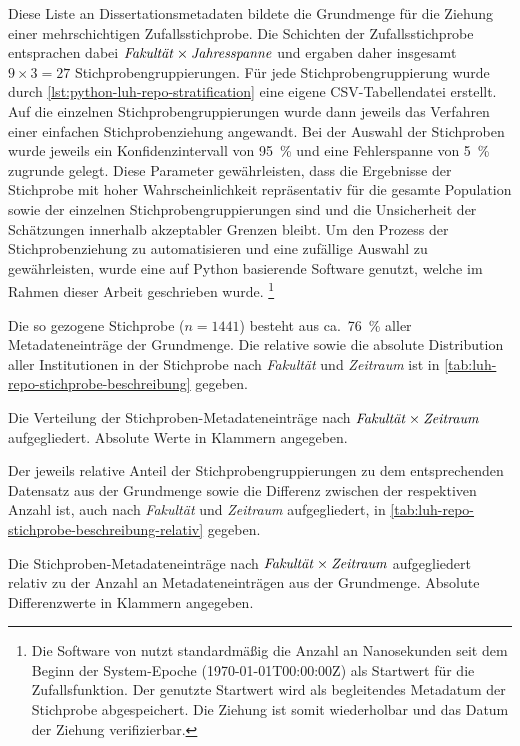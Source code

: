 Diese Liste an Dissertationsmetadaten bildete die Grundmenge für die Ziehung einer mehrschichtigen Zufallsstichprobe.
Die Schichten der Zufallsstichprobe entsprachen dabei $\text{\textit{Fakultät}}\times\text{\textit{Jahresspanne}}$ und ergaben daher insgesamt $\num{9}\times\num{3}=\num{27}$ Stichprobengruppierungen.
Für jede Stichprobengruppierung wurde durch \cref{lst:python-luh-repo-stratification} eine eigene CSV-Tabellendatei erstellt.
Auf die einzelnen Stichprobengruppierungen wurde dann jeweils das Verfahren einer einfachen Stichprobenziehung angewandt.
Bei der Auswahl der Stichproben wurde jeweils ein Konfidenzintervall von \SI[round-mode=places,round-precision=2]{95}{\percent} und eine Fehlerspanne von \SI[round-mode=places,round-precision=2]{5}{\percent} zugrunde gelegt.
Diese Parameter gewährleisten, dass die Ergebnisse der Stichprobe mit hoher Wahrscheinlichkeit repräsentativ für die gesamte Population sowie der einzelnen Stichprobengruppierungen sind und die Unsicherheit der Schätzungen innerhalb akzeptabler Grenzen bleibt.
Um den Prozess der Stichprobenziehung zu automatisieren und eine zufällige Auswahl zu gewährleisten, wurde eine auf Python basierende Software \autocite{Krassnig2024-csv} genutzt, welche im Rahmen dieser Arbeit geschrieben wurde.%
\footnote{%
Die Software von \citeauthor{Krassnig2024-csv} \autocite{Krassnig2024-csv} nutzt standardmäßig die Anzahl an Nanosekunden seit dem Beginn der System-Epoche (1970-01-01T00:00:00Z) als Startwert für die Zufallsfunktion.
Der genutzte Startwert wird als begleitendes Metadatum der Stichprobe abgespeichert.
Die Ziehung ist somit wiederholbar und das Datum der Ziehung verifizierbar.} 

Die so gezogene Stichprobe ($n=1441$) besteht aus ca.~\SI[round-mode=places,round-precision=2]{76}{\percent} aller Metadateneinträge der Grundmenge.
Die relative sowie die absolute Distribution aller Institutionen in der Stichprobe nach \textit{Fakultät} und \textit{Zeitraum} ist in \cref{tab:luh-repo-stichprobe-beschreibung} gegeben.
\begin{table}[!htbp]
	\caption{Die Verteilung der Stichproben-Metadateneinträge nach $\text{\textit{Fakultät}}\times\text{\textit{Zeitraum}}$ aufgegliedert.
    Absolute Werte in Klammern angegeben.}
    
	\label{tab:luh-repo-stichprobe-beschreibung}
\end{table}
Der jeweils relative Anteil der Stichprobengruppierungen zu dem entsprechenden Datensatz aus der Grundmenge sowie die Differenz zwischen der respektiven Anzahl ist, auch nach \textit{Fakultät} und \textit{Zeitraum} aufgegliedert, in \cref{tab:luh-repo-stichprobe-beschreibung-relativ} gegeben.
\begin{table}[!htbp]
	\caption{Die Stichproben-Metadateneinträge nach $\text{\textit{Fakultät}}\times\text{\textit{Zeitraum}}$ aufgegliedert relativ zu der Anzahl an Metadateneinträgen aus der Grundmenge.
    Absolute Differenzwerte in Klammern angegeben.}
    
	\label{tab:luh-repo-stichprobe-beschreibung-relativ}
\end{table}

